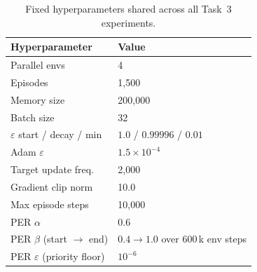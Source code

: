 \documentclass[12pt,a4paper]{report}
\begin{document}
\begin{table}[H]
\centering
\caption{Fixed hyperparameters shared across all Task~3 experiments.}
{\setlength{\tabcolsep}{14pt}
\begin{tabular}{ll}
\toprule
\textbf{Hyperparameter} & \textbf{Value} \\
\midrule
Parallel envs           & 4 \\
Episodes                & 1{,}500 \\
Memory size             & 200{,}000 \\
Batch size              & 32 \\
$\varepsilon$ start / decay / min & $1.0$ / $0.99996$ / $0.01$ \\
Adam $\varepsilon$      & $1.5\times10^{-4}$ \\
Target update freq.     & 2{,}000 \\
Gradient clip norm      & 10.0 \\
Max episode steps       & 10{,}000 \\
PER $\alpha$            & 0.6 \\
PER $\beta$ (start $\to$ end) & $0.4 \to 1.0$ over 600\,k env steps \\
PER $\varepsilon$ (priority floor) & $10^{-6}$ \\
\bottomrule
\end{tabular}}
\end{table}
\end{document}
